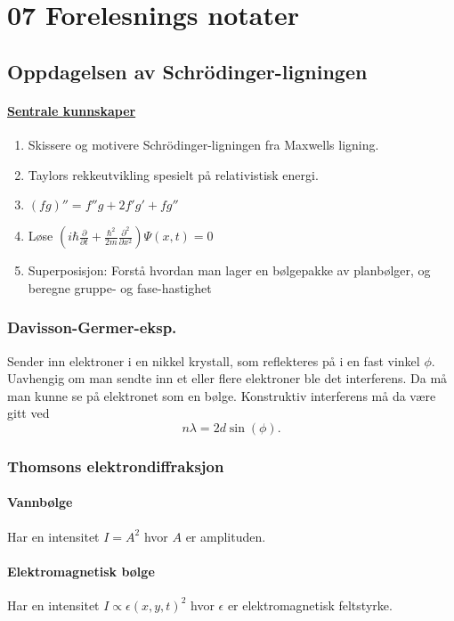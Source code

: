 \section{07 Forelesnings notater}
\subsection{Oppdagelsen av Schrödinger-ligningen}
\paragraph{\underline{Sentrale kunnskaper}}
\begin{enumerate}
    \item Skissere og motivere Schrödinger-ligningen fra Maxwells ligning. 
    \item Taylors rekkeutvikling spesielt på relativistisk energi. 
    \item $(fg)'' = f''g + 2f'g' + fg''$
    \item Løse $\displaystyle \left( iℏ \frac{∂ }{∂ t} + \frac{ℏ^{2}}{2m}\frac{∂^2 }{∂ x^2} \right) Ψ(x,t) = 0 $
    \item Superposisjon: Forstå hvordan man lager en bølgepakke av planbølger, og beregne gruppe- og fase-hastighet 
\end{enumerate}
\subsubsection{Davisson-Germer-eksp.}
Sender inn elektroner i en nikkel krystall, som reflekteres på i en fast vinkel $ϕ$. Uavhengig om man sendte inn et eller flere elektroner ble det interferens. Da må man kunne se på elektronet som en bølge. Konstruktiv interferens må da være gitt ved 
\[
nλ = 2d\sin(ϕ).
\]
\subsubsection{Thomsons elektrondiffraksjon}
\paragraph{Vannbølge}
Har en intensitet $I = A^2$ hvor $A$ er amplituden.

\paragraph{Elektromagnetisk bølge}
Har en intensitet $I \propto ϵ(x, y, t)^2 $ hvor $\epsilon$ er elektromagnetisk feltstyrke.

